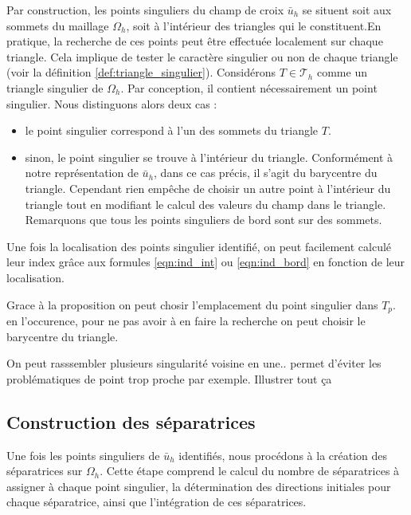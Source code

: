 Par construction, les points singuliers du champ de croix $\bar{u}_h$ se situent soit aux sommets du maillage $\Omega_h$, soit à l'intérieur des triangles qui le constituent.En pratique, la recherche de ces points peut être effectuée localement sur chaque triangle. Cela implique de tester le caractère singulier ou non de chaque triangle (voir la définition \ref{def:triangle_singulier}). Considérons $T\in\mathcal{T}_h$ comme un triangle singulier de $\Omega_h$. Par conception, il contient nécessairement un point singulier. Nous distinguons alors deux cas :\\
\begin{itemize}
 \item le point singulier correspond à l'un des sommets du triangle $T$.\\
 \item sinon, le point singulier se trouve à l'intérieur du triangle. Conformément à notre représentation de $\bar{u}_h$, dans ce cas précis, il s'agit du barycentre du triangle. Cependant rien empêche de choisir un autre point à l'intérieur du triangle tout en modifiant le calcul des valeurs du champ dans le triangle. Remarquons que tous les points singuliers de bord sont sur des sommets.\\
\end{itemize}

Une fois la localisation des points singulier identifié, on peut facilement calculé leur index grâce aux formules \ref{eqn:ind_int} ou \ref{eqn:ind_bord} en fonction de leur localisation.

\begin{remark}
    Grace à la proposition on peut chosir l'emplacement du point singulier dans $T_p$. en l'occurence, pour ne pas avoir à en faire la recherche on peut choisir le barycentre du triangle.\\
\end{remark}


On peut rasssembler plusieurs singularité voisine en une.. permet d'éviter les problématiques de point trop proche par exemple.
Illustrer tout ça 

\subsection{Construction des séparatrices}

Une fois les points singuliers de $\bar{u}_h$ identifiés, nous procédons à la création des séparatrices sur $\Omega_h$. Cette étape comprend le calcul du nombre de séparatrices à assigner à chaque point singulier, la détermination des directions initiales pour chaque séparatrice, ainsi que l'intégration de ces séparatrices.


